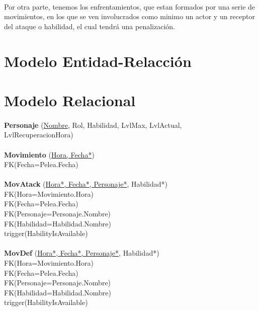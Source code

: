 \documentclass[a4paper,10pt]{article}
\newcommand\tab[1][1cm]{\hspace*{#1}}
\begin{document}
\paragraph{}
Por otra parte, tenemos los enfrentamientos, que estan formados por una serie de movimientos, en los que se ven involucrados como minimo un actor y un receptor del ataque o habilidad, el cual tendrá una penalización.


\pagebreak


\section{Modelo Entidad-Relacción}
\scalebox{0.5}{}


\pagebreak

\section{Modelo Relacional}

\paragraph{}
{\bf Personaje} (\underline{Nombre}, Rol, Habilidad, LvlMax, LvlActual, \\\tab\tab LvlRecuperacionHora)

\paragraph{}
{\bf Movimiento} (\underline{Hora, Fecha*})\\
\tab FK(Fecha=Pelea.Fecha)

\paragraph{}
{\bf MovAtack} (\underline{Hora*, Fecha*, Personaje*}, Habilidad*)\\
\tab FK(Hora=Movimiento.Hora)\\
\tab FK(Fecha=Pelea.Fecha)\\
\tab FK(Personaje=Personaje.Nombre)\\
\tab FK(Habilidad=Habilidad.Nombre)\\
\tab trigger(HabilityIsAvailable)

\paragraph{}
{\bf MovDef} (\underline{Hora*, Fecha*, Personaje*}, Habilidad*)\\
\tab FK(Hora=Movimiento.Hora)\\
\tab FK(Fecha=Pelea.Fecha)\\
\tab FK(Personaje=Personaje.Nombre)\\
\tab FK(Habilidad=Habilidad.Nombre)\\
\tab trigger(HabilityIsAvailable)
\end{document}
